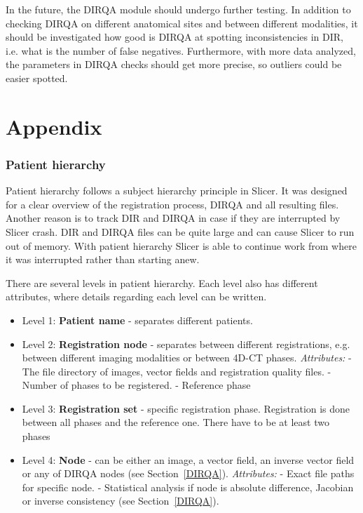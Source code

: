 \documentclass[type=dr, dr=rernat, accentcolor=tud7b,colorbacktitle, bigchapter, openright, twoside, 12pt ]{tudthesis}
\begin{document}
In the future, the DIRQA module should undergo further testing. In addition to checking DIRQA on different anatomical sites and between different modalities, 
it should be investigated how good is DIRQA at spotting inconsistencies in DIR, i.e. what is the number of false negatives. Furthermore, with more
data analyzed, the parameters in DIRQA checks should get more precise, so outliers could be easier spotted.

\newpage


\section{Appendix}
\label{RegHierarchy}
% 

\subsubsection{Patient hierarchy} 
\label{PatHierarchy}

Patient hierarchy follows a subject hierarchy principle in Slicer. It was designed for a clear overview of the registration process, DIRQA and all resulting files. Another reason is to track DIR
and DIRQA in case if they are interrupted by Slicer crash. DIR and DIRQA files can be quite large and can cause Slicer to run out of memory. With patient hierarchy Slicer is able to continue work
from where it was interrupted rather than starting anew.

There are several levels in patient hierarchy. Each level also has different attributes, where details regarding each level can be written.

\begin{itemize}
	\item Level 1: \textbf{Patient name} - separates different patients.
	\item Level 2: \textbf{Registration node} - separates between different registrations, e.g. between different imaging modalities or between 4D-CT phases. 
	\subitem \textit{Attributes:}
	\subitem - The file directory of images, vector fields and registration quality files.
	\subitem - Number of phases to be registered.
	\subitem - Reference phase
	\item Level 3: \textbf{Registration set} - specific registration phase. Registration is done between all phases and the reference one. There have to be at least two phases
	\item Level 4: \textbf{Node} - can be either an image, a vector field, an inverse vector field or any of DIRQA nodes (see Section~\ref{DIRQA}).
	\subitem \textit{Attributes:}
	\subitem - Exact file paths for specific node.
	\subitem - Statistical analysis if node is absolute difference, Jacobian or inverse consistency (see Section~\ref{DIRQA}).
\end{itemize}
\end{document}
